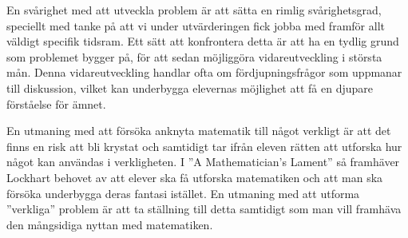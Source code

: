 \textcolor{Mahogany}{En svårighet med att utveckla problem är att sätta en rimlig svårighetsgrad, speciellt med tanke på att vi under utvärderingen fick jobba med framför allt väldigt specifik tidsram. Ett sätt att konfrontera detta är att ha en tydlig grund som problemet bygger på, för att sedan möjliggöra vidareutveckling i största mån. Denna vidareutveckling handlar ofta om fördjupningsfrågor som uppmanar till diskussion, vilket kan underbygga elevernas möjlighet att få en djupare förståelse för ämnet.}
\newline

\textcolor{Mahogany}{En utmaning med att försöka anknyta matematik till något verkligt är att det finns en risk att bli krystat och samtidigt tar ifrån eleven rätten att utforska hur något kan användas i verkligheten. I ''A Mathematician's Lament'' \cite{lockhart} så framhäver Lockhart behovet av att elever ska få utforska matematiken och att man ska försöka underbygga deras fantasi istället. En utmaning med att utforma ''verkliga'' problem är att ta ställning till detta samtidigt som man vill framhäva den mångsidiga nyttan med matematiken.}

